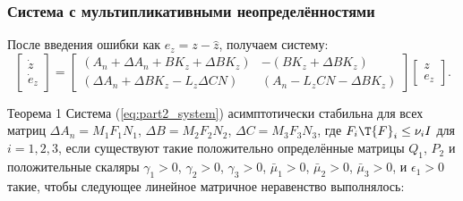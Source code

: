 \begin{frame}
	\frametitle{Система с мультипликативными неопределённостями}
	После введения ошибки как $e_z=z-\hat{z}$, получаем систему:
	\begin{equation}
		\label{eq:part2_system}
		\begin{bmatrix}
			\dot{z} \\ \dot{e}_z
		\end{bmatrix}=\begin{bmatrix}
			({A}_n+\Delta {A}_n +{B}{K}_z+\Delta {B}{K}_z) & -({B}{K}_z+\Delta {B}{K}_z) \\
			(\Delta {A}_n +\Delta {B}{K}_z-{L}_z\Delta {C}{N}) & ({A}_n-{L}_z{C}{N}-\Delta {B}{K}_z)        \end{bmatrix}\begin{bmatrix}
			z \\ e_z
		\end{bmatrix}.
	\end{equation}
	\begin{block}{Теорема 1}
		Система (\ref{eq:part2_system}) асимптотически стабильна для всех матриц
		$\Delta {A}_n={M}_1{F}_1{N}_1$, 
		$\Delta {B}= {M}_2{F}_2{N}_2$, 
		$\Delta {C} = {M}_3{F}_3{N}_3$,
		где
		${F}_i\T{F}_i\leq \nu_i {I}$ для $i=1,2,3$,
		если существуют такие положительно определённые матрицы ${Q}_1$, ${P}_2$ и положительные скаляры
		$\gamma_1>0$, $\gamma_2>0$, $\gamma_3>0$, $\bar{\mu}_1>0$, $\bar{\mu}_2>0$, $\bar{\mu}_3>0$, и $\epsilon_1 > 0$ такие, чтобы следующее линейное матричное неравенство выполнялось:
	\end{block}
\end{frame}

